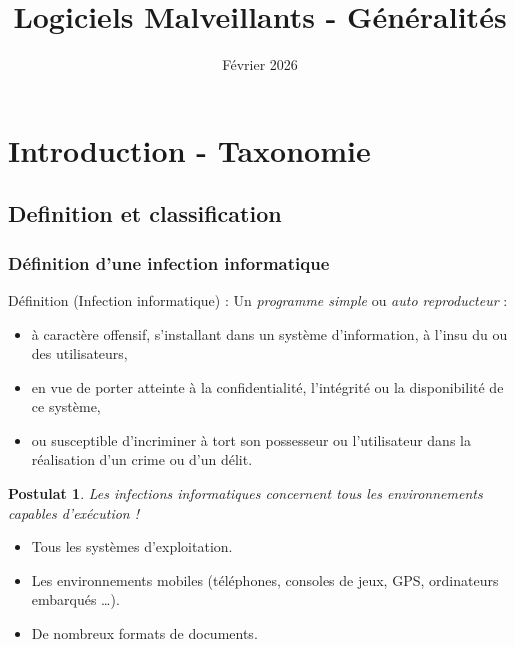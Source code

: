 \documentclass{beamer}
\title{Logiciels Malveillants - Généralités}
\date{Février 2026}
\newtheorem{deft}{Définition}
\newtheorem{postulat}{Postulat}
\newcommand{\enlight}[1]{\textit{\color{blue}#1}}
\begin{document}
\maketitle


\section{Introduction - Taxonomie}

\subsection{Definition et classification}



\begin{frame}
\frametitle{Définition d'une infection informatique}

 \begin{block}{Définition (Infection informatique) :} 
  Un \enlight{programme simple} ou \enlight{auto reproducteur} :
\begin{itemize}
\item  à caractère offensif, s'installant dans un système d'information, à l'insu du ou des utilisateurs,
\item en vue de porter atteinte à la confidentialité, l'intégrité ou la disponibilité de ce système,
  \item ou susceptible d'incriminer à tort son possesseur ou l'utilisateur dans la réalisation d'un crime ou d'un délit.
\end{itemize}
\end{block}

\end{frame}



\begin{frame}
  
\begin{postulat}
Les infections informatiques concernent tous les environnements capables d'exécution !
\end{postulat}

\begin{itemize}
\item Tous les systèmes d'exploitation.
\item Les environnements mobiles (téléphones, consoles de jeux, GPS, ordinateurs embarqués \ldots).
\item De nombreux formats de documents.
\end{itemize}
\end{frame}
\end{document}
